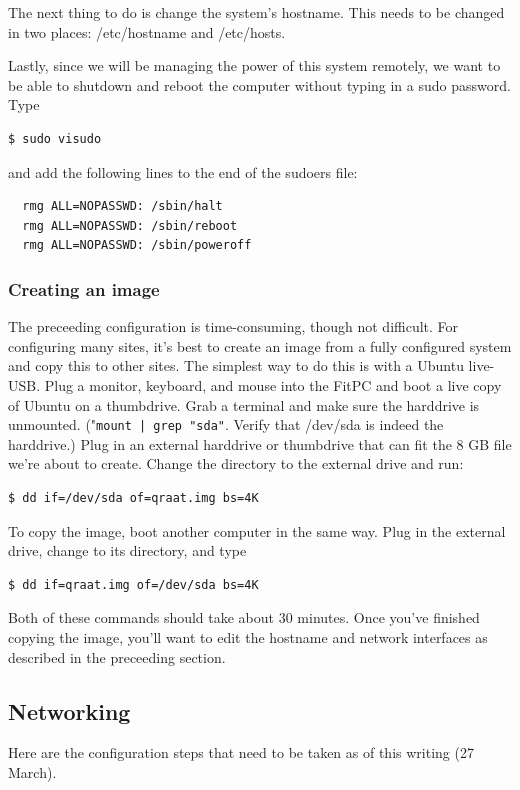\documentclass[letter]{article}
\begin{document}
The next thing to do is change the system's hostname. This needs to be changed in two places:
/etc/hostname and /etc/hosts. 

Lastly, since we will be managing the power of this system remotely, we want to be able to 
shutdown and reboot the computer without typing in a sudo password. Type 
\begin{verbatim}
$ sudo visudo
\end{verbatim}
and add the following lines to the end of the sudoers file: 
\begin{verbatim}
  rmg ALL=NOPASSWD: /sbin/halt
  rmg ALL=NOPASSWD: /sbin/reboot
  rmg ALL=NOPASSWD: /sbin/poweroff
\end{verbatim}

\subsubsection{Creating an image}
The preceeding configuration is time-consuming, though not difficult. For configuring many sites, 
it's best to create an image from a fully configured system and copy this to other sites. The 
simplest way to do this is with a Ubuntu live-USB. Plug a monitor, keyboard, and mouse into the 
FitPC and boot a live copy of Ubuntu on a thumbdrive. Grab a terminal and make sure the harddrive
is unmounted. ("\texttt{mount | grep "sda"}. Verify that /dev/sda is indeed the 
harddrive.) Plug in an external harddrive or thumbdrive that can 
fit the 8 GB file we're about to create. Change the directory to the external drive and run: 
\begin{verbatim}
$ dd if=/dev/sda of=qraat.img bs=4K 
\end{verbatim}
To copy the image, boot another computer in the same way. Plug in the external drive, change to 
its directory, and type
\begin{verbatim}
$ dd if=qraat.img of=/dev/sda bs=4K
\end{verbatim}

Both of these commands should take about 30 minutes. Once you've finished copying the image, you'll 
want to edit the hostname and network interfaces as described in the preceeding section. 



\subsection{Networking}
Here are the configuration steps that need to be taken as of this writing (27 March).
\end{document}
